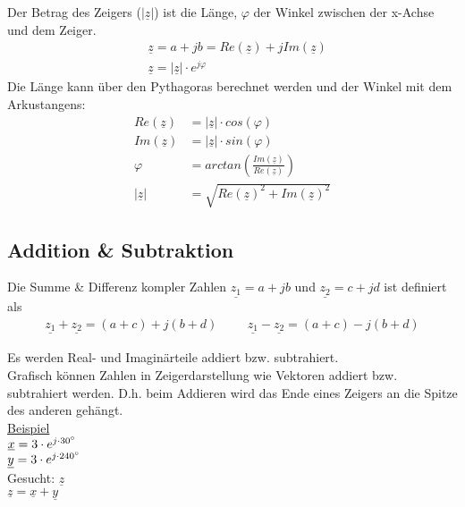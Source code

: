 Der Betrag des Zeigers ($|\underline{z}|$) ist die Länge, $\varphi$ der Winkel zwischen der x-Achse und dem Zeiger.
\begin{align}
    &\underline{z}=a+jb=Re(\underline{z})+j Im(\underline{z})   \\
    &\underline{z}=|\underline{z}|\cdot e^{j\varphi}
\end{align}
Die Länge kann über den Pythagoras berechnet werden und der Winkel mit dem Arkustangens:
\begin{align}
    Re(\underline{z})&=|\underline{z}|\cdot cos(\varphi)                \\
    Im(\underline{z})&=|\underline{z}|\cdot sin(\varphi)                \\
    \varphi&=arctan(\frac{Im(\underline{z})}{Re(\underline{z})})        \\
    |\underline{z}|&=\sqrt{Re(\underline{z})^{2}+Im(\underline{z})^{2}}
\end{align}

\newpage

\subsection{Addition \& Subtraktion}
Die Summe \& Differenz kompler Zahlen $\underline{z_1}=a+jb$ und $\underline{z_2}=c+jd$ ist definiert als
\begin{align}
    \underline{z_1} + \underline{z_2} = (a+c) + j(b+d) \hspace{1cm} \underline{z_1} - \underline{z_2} = (a+c) - j(b+d)
\end{align}

Es werden Real- und Imaginärteile addiert bzw. subtrahiert.\\

Grafisch können Zahlen in Zeigerdarstellung wie Vektoren addiert bzw. subtrahiert werden. D.h. beim Addieren wird das Ende eines Zeigers an die Spitze des anderen gehängt.\\

\underline{Beispiel} \\
$\underline{x} = 3 \cdot e^{j \cdot 30\degree}$ \\
$\underline{y} = 3 \cdot e^{j \cdot 240\degree}$ \\

Gesucht: $\underline{z}$\\
$\underline{z}=\underline{x}+\underline{y}$

